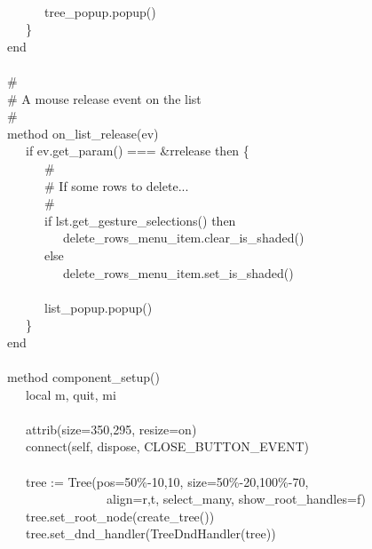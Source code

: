 {\ \\
\>   \ \ \ \ \ \ tree\_popup.popup() \\
\>   \ \ \ \} \\
\>   end \\
\ \\
\>   \# \\
\>   \# A mouse release event on the list \\
\>   \# \\
\>   method on\_list\_release(ev) \\
\>   \ \ \ if ev.get\_param() === \&rrelease then \{ \\
\>   \ \ \ \ \ \ \# \\
\>   \ \ \ \ \ \ \# If some rows to delete... \\
\>   \ \ \ \ \ \ \# \\
\>   \ \ \ \ \ \ if lst.get\_gesture\_selections() then \\
\>   \ \ \ \ \ \ \ \ \ delete\_rows\_menu\_item.clear\_is\_shaded() \\
\>   \ \ \ \ \ \ else \\
\>   \ \ \ \ \ \ \ \ \ delete\_rows\_menu\_item.set\_is\_shaded() \\
\ \\
\>   \ \ \ \ \ \ list\_popup.popup() \\
\>   \ \ \ \} \\
\>   end \\
\ \\
\>   method component\_setup() \\
\>   \ \ \ local m, quit, mi \\
\ \\
\>   \ \ \ attrib({\textquotedbl}size=350,295{\textquotedbl},
{\textquotedbl}resize=on{\textquotedbl}) \\
\>   \ \ \ connect(self, {\textquotedbl}dispose{\textquotedbl},
CLOSE\_BUTTON\_EVENT) \\
\ \\
\>   \ \ \ tree := Tree({\textquotedbl}pos=50\%-10,10{\textquotedbl},
{\textquotedbl}size=50\%-20,100\%-70{\textquotedbl}, \\
\>   \ \ \ \ \ \ \ \ \ \ \ \ \ \ \ \ {\textquotedbl}align=r,t{\textquotedbl},
{\textquotedbl}select\_many{\textquotedbl},
{\textquotedbl}show\_root\_handles=f{\textquotedbl}) \\
\>   \ \ \ tree.set\_root\_node(create\_tree()) \\
\>   \ \ \ tree.set\_dnd\_handler(TreeDndHandler(tree)) \\
}
